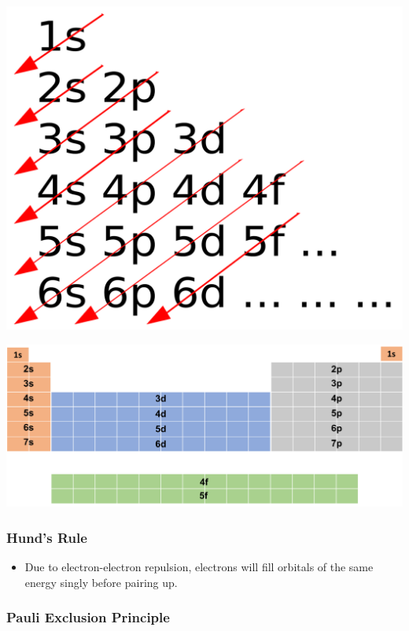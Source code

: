 \documentclass{article}
\begin{document}
\begin{center}
    \includegraphics[scale=0.1]{aufbau_principle}
\end{center}

\begin{center}
    \includegraphics[scale=0.4]{aufbau_principle_2}
\end{center}

\subsubsection{Hund's Rule}

\begin{itemize}
    \item Due to electron-electron repulsion, electrons will fill orbitals of the same energy singly before pairing up.
\end{itemize}

\subsubsection{Pauli Exclusion Principle}
\end{document}
